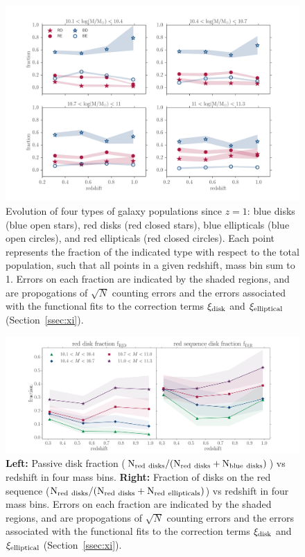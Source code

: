 \documentclass[useAMS,usenatbib]{mn2e}
\begin{document}
\begin{figure}
\centering
\includegraphics[width=\textwidth,trim={0cm 0cm 2cm 1cm},clip]{figures/morphologies_evolved.pdf}
\caption{Evolution of four types of galaxy populations since $z=1$: blue disks (blue open stars), red disks (red closed stars), blue ellipticals (blue open circles), and red ellipticals (red closed circles). Each point represents the fraction of the indicated type with respect to the total population, such that all points in a given redshift, mass bin sum to 1. Errors on each fraction are indicated by the shaded regions, and are propogations of $\sqrt{N}$ counting errors and the errors associated with the functional fits to the correction terms $\xi_{\rm disk}$ and $\xi_{\rm elliptical}$ (Section~\ref{ssec:xi}). }
\label{fig:all_plot}
\end{figure}


\begin{figure}
\centering
\includegraphics[width=\textwidth,trim={0cm 0cm 2cm 1cm},clip]{figures/red_disk_fractions.pdf}
\caption{\textbf{Left:} Passive disk fraction ($\rm N_{red~disks}/(N_{red~disks}+N_{blue~disks})$) vs redshift in four mass bins. \textbf{Right:} Fraction of disks on the red sequence ($\rm N_{red~disks}/(N_{red~disks}+N_{red~ellipticals})$) vs redshift in four mass bins. Errors on each fraction are indicated by the shaded regions, and are propogations of $\sqrt{N}$ counting errors and the errors associated with the functional fits to the correction terms $\xi_{\rm disk}$ and $\xi_{\rm elliptical}$ (Section~\ref{ssec:xi}).} 
\label{fig:f_results}
\end{figure}
\end{document}
